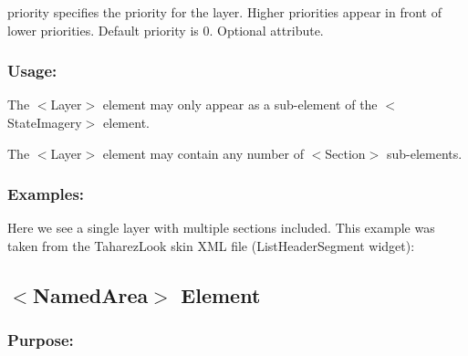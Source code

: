 \begin{DoxyItemize}
\item {\ttfamily priority} specifies the priority for the layer. Higher priorities appear in front of lower priorities. Default priority is 0. Optional attribute.\end{DoxyItemize}
\hypertarget{fal_element_ref_fal_elem_ref_sec_23_3}{}\subsubsection{Usage\+:}\label{fal_element_ref_fal_elem_ref_sec_23_3}

\begin{DoxyItemize}
\item The {\ttfamily $<$Layer$>$} element may only appear as a sub-\/element of the {\ttfamily $<$State\+Imagery$>$} element. 
\item The {\ttfamily $<$Layer$>$} element may contain any number of {\ttfamily $<$Section$>$} sub-\/elements. 
\end{DoxyItemize}\hypertarget{fal_element_ref_fal_elem_ref_sec_23_4}{}\subsubsection{Examples\+:}\label{fal_element_ref_fal_elem_ref_sec_23_4}
Here we see a single layer with multiple sections included. This example was taken from the Taharez\+Look skin X\+ML file (List\+Header\+Segment widget)\+: 
\begin{DoxyCode}{0}
\end{DoxyCode}
\hypertarget{fal_element_ref_fal_elem_ref_sec_24}{}\subsection{$<$\+Named\+Area$>$ Element}\label{fal_element_ref_fal_elem_ref_sec_24}
\hypertarget{fal_element_ref_fal_elem_ref_sec_24_1}{}\subsubsection{Purpose\+:}\label{fal_element_ref_fal_elem_ref_sec_24_1}
